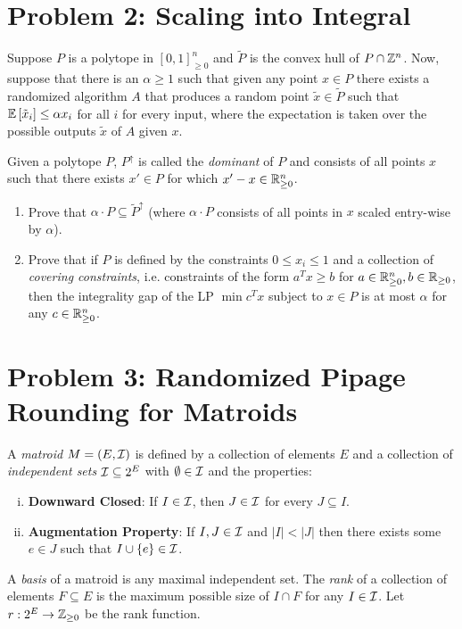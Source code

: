\section{Problem 2: Scaling into Integral}

Suppose $P$ is a polytope in $[0,1]_{\ge 0}^n$ and $\tilde{P}$ is the convex hull of $P \cap \mathbb Z^n$. Now, suppose that there is an $\alpha \ge 1$ such that given any point $x \in P$ there exists a randomized algorithm $A$ that produces a random point $\tilde{x} \in \tilde{P}$ such that ${\mathbb{E}}\left[\tilde{x}_i\right] \le \alpha x_i$ for all $i$ for every input, where the expectation is taken over the possible outputs $\tilde{x}$ of $A$ given $x$. 

Given a polytope $P$, $P^\uparrow$ is called the \textit{dominant} of $P$ and consists of all points $x$ such that there exists $x' \in P$ for which $x'-x \in \mathbb R^n_{\ge 0}$.
\begin{enumerate}
	\item Prove that $\alpha \cdot P \subseteq \tilde{P}^\uparrow$ (where $\alpha \cdot P$ consists of all points in $x$ scaled entry-wise by $\alpha$).
	\item Prove that if $P$ is defined by the constraints $0 \le x_i \le 1$ and a collection of \textit{covering constraints}, i.e. constraints of the form $a^Tx \ge b$ for $a \in \mathbb R_{\ge 0}^n, b \in \mathbb R_{\ge 0}$, then the integrality gap of the LP $\min c^Tx$ subject to $x \in P$ is at most $\alpha$ for any $c \in \mathbb R^n_{\ge 0}$.
\end{enumerate}

\section{Problem 3: Randomized Pipage Rounding for Matroids}

A \textit{matroid} $M=(E,{\cal I})$ is defined by a collection of elements $E$ and a collection of \textit{independent sets} ${\cal I} \subseteq 2^E$ with $\emptyset \in {\cal I}$ and the properties:
\begin{enumerate}[(i)]
\item \textbf{Downward Closed}: If $I \in {\cal I}$, then $J \in {\cal I}$ for every $J \subseteq I$.
\item \textbf{Augmentation Property}: If $I,J \in {\cal I}$ and $|I| < |J|$ then there exists some $e \in J$ such that $I \cup \{e\} \in {\cal I}$. 
\end{enumerate}
A \textit{basis} of a matroid is any maximal independent set. The \textit{rank} of a collection of elements $F \subseteq E$ is the maximum possible size of $I \cap F$ for any $I \in {\cal I}$. Let $r: 2^E \to \mathbb Z_{\ge 0}$ be the rank function.

